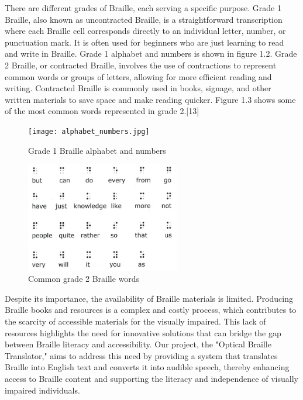 There are different grades of Braille, each serving a specific purpose. Grade 1 Braille, also known as uncontracted Braille, is a straightforward transcription where each Braille cell corresponds directly to an individual letter, number, or punctuation mark. It is often used for beginners who are just learning to read and write in Braille. Grade 1 alphabet and numbers is shown in figure 1.2. Grade 2 Braille, or contracted Braille, involves the use of contractions to represent common words or groups of letters, allowing for more efficient reading and writing. Contracted Braille is commonly used in books, signage, and other written materials to save space and make reading quicker. Figure 1.3 shows some of the most common words represented in grade 2.[13]

\renewcommand{\thefigure}{1.\arabic{figure}}

\begin{figure}[h]
\centering
\texttt{[image: alphabet\_numbers.jpg]}
\caption{Grade 1 Braille alphabet and numbers}
\label{fig:example}
\end{figure}

\begin{figure}[h]
\centering
\includegraphics[width=0.6\textwidth]{grade2.jpg}
\caption{Common grade 2 Braille words}
\label{fig:example}
\end{figure}


Despite its importance, the availability of Braille materials is limited. Producing Braille books and resources is a complex and costly process, which contributes to the scarcity of accessible materials for the visually impaired. This lack of resources highlights the need for innovative solutions that can bridge the gap between Braille literacy and accessibility. Our project, the "Optical Braille Translator," aims to address this need by providing a system that translates Braille into English text and converts it into audible speech, thereby enhancing access to Braille content and supporting the literacy and independence of visually impaired individuals.

